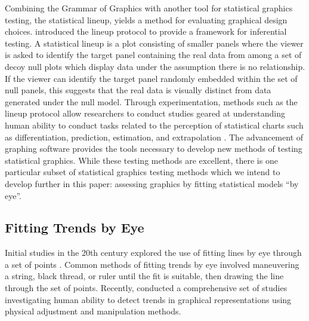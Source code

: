 \documentclass[12pt]{article}
\begin{document}
Combining the Grammar of Graphics with another tool for statistical
graphics testing, the statistical lineup, yields a method for evaluating
graphical design choices. \citet{buja2009statistical} introduced the
lineup protocol to provide a framework for inferential testing. A
statistical lineup is a plot consisting of smaller panels where the
viewer is asked to identify the target panel containing the real data
from among a set of decoy null plots which display data under the
assumption there is no relationship. If the viewer can identify the
target panel randomly embedded within the set of null panels, this
suggests that the real data is visually distinct from data generated
under the null model. Through experimentation, methods such as the
lineup protocol allow researchers to conduct studies geared at
understanding human ability to conduct tasks related to the perception
of statistical charts such as differentiation, prediction, estimation,
and extrapolation
\citep{vanderplas2017clusters, vanderplas2015spatial, hofmann2012graphical}.
The advancement of graphing software provides the tools necessary to
develop new methods of testing statistical graphics. While these testing
methods are excellent, there is one particular subset of statistical
graphics testing methods which we intend to develop further in this
paper: assessing graphics by fitting statistical models ``by eye''.

\hypertarget{fitting-trends-by-eye}{%
\subsection{Fitting Trends by Eye}\label{fitting-trends-by-eye}}

Initial studies in the 20th century explored the use of fitting lines by
eye through a set of points
\citep{unwin1988eyeballing, finney1951subjective, mosteller1981eye}.
Common methods of fitting trends by eye involved maneuvering a string,
black thread, or ruler until the fit is suitable, then drawing the line
through the set of points. Recently, \citet{ciccione2021can} conducted a
comprehensive set of studies investigating human ability to detect
trends in graphical representations using physical adjustment and
manipulation methods.
\end{document}
